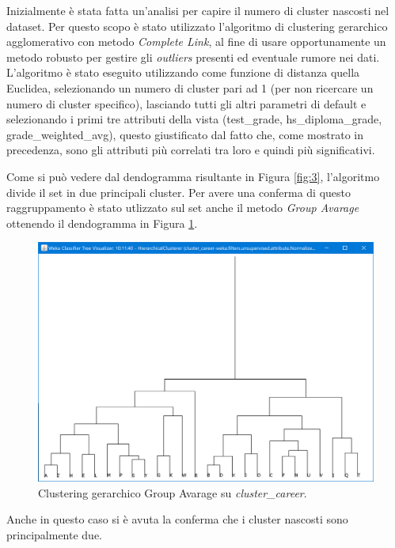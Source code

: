 \documentclass[]{article}
\begin{document}
Inizialmente \`{e} stata fatta un'analisi per capire il numero di cluster nascosti nel dataset. Per questo scopo \`{e} stato utilizzato l'algoritmo di clustering gerarchico agglomerativo con metodo \textit{Complete Link}, al fine di usare opportunamente un metodo robusto per gestire gli \textit{outliers} presenti ed eventuale rumore nei dati. L'algoritmo \`{e} stato eseguito utilizzando come funzione di distanza quella Euclidea, selezionando un numero di cluster pari ad 1 (per non ricercare un numero di cluster specifico), lasciando tutti gli altri parametri di default e selezionando i primi tre attributi della vista (test\_grade, hs\_diploma\_grade, grade\_weighted\_avg), questo giustificato dal fatto che, come mostrato in precedenza, sono gli attributi pi\`{u} correlati tra loro e quindi pi\`{u} significativi.

Come si pu\`{o} vedere dal dendogramma risultante in Figura \ref{fig:3}, l'algoritmo divide il set in due principali cluster. Per avere una conferma di questo raggruppamento \`{e} stato utlizzato sul set anche il metodo \textit{Group Avarage} ottenendo il dendogramma in Figura \ref{fig:4}.

\begin{figure}[!]
	\centering
	\includegraphics[scale=0.5]{Img/clustering_gerarchico__career_average.png}
	\caption{Clustering gerarchico Group Avarage su \textit{cluster\_career}.
		\label{fig:4}}
\end{figure} 

Anche in questo caso si \`{e} avuta la conferma che i cluster nascosti sono principalmente due. \\
\end{document}
